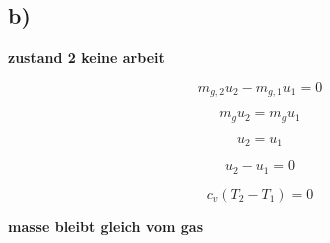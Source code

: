 

\subsection*{b)}

\textbf{zustand 2 keine arbeit}

\[
m_{g,2} u_{2} - m_{g,1} u_{1} = 0
\]

\[
m_{g} u_{2} = m_{g} u_{1}
\]

\[
u_{2} = u_{1}
\]

\[
u_{2} - u_{1} = 0
\]

\[
c_{v} (T_{2} - T_{1}) = 0
\]

\textbf{masse bleibt gleich vom gas}